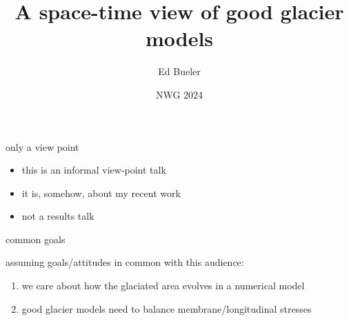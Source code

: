 \documentclass[10pt,dvipsnames]{beamer}
\title{A space-time view of good glacier models}
\date{NWG 2024}
\author{Ed Bueler}
\institute{University of Alaska Fairbanks}
\begin{document}
\graphicspath{{figs/}}

\maketitle





\begin{frame}{only a view point}

\begin{itemize}
\item this is an informal view-point talk
\item it is, somehow, about my recent work
\item<2> not a results talk
\end{itemize}
\end{frame}


\begin{frame}{common goals}

assuming goals/attitudes in common with this audience:
\begin{enumerate}
\item we care about how the glaciated area evolves in a numerical model
\item good glacier models need to balance membrane/longitudinal stresses
\end{enumerate}
\end{frame}
\end{document}
